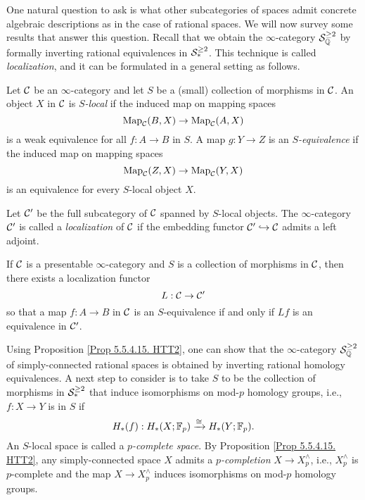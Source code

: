 One natural question to ask is what other subcategories of spaces admit concrete algebraic descriptions as in the case of rational spaces.
We will now survey some results that answer this question.
Recall that we obtain the $\infty$-category ${\mathcal{S}}^{\geq 2}_{{\mathbb{Q}}}$ by formally inverting rational equivalences in ${\mathcal{S}}^{\geq 2}_{*}$. This technique is called \emph{localization}, and it can be formulated in a general setting as follows.
\begin{definition}
\label{localization}
Let ${\mathcal{C}}$ be an $\infty$-category and let $S$ be a (small) collection of morphisms in ${\mathcal{C}}$. 
An object $X$ in ${\mathcal{C}}$ is \emph{$S$-local} if the induced map on mapping spaces
$$
\operatorname{Map}_{{\mathcal{C}}}(B, X) \to \operatorname{Map}_{{\mathcal{C}}}(A, X)
$$
is a weak equivalence for all $f:A \to B$ in $S$. A map $g:Y \to Z$ is an \emph{$S$-equivalence} if the induced map on mapping spaces
$$
\operatorname{Map}_{{\mathcal{C}}}(Z, X) \to \operatorname{Map}_{{\mathcal{C}}}(Y, X)
$$
is an equivalence for every $S$-local object $X$.
\end{definition}
Let ${\mathcal{C}}'$ be the full subcategory of ${\mathcal{C}}$ spanned by $S$-local objects. The $\infty$-category ${\mathcal{C}}'$ is called a \emph{localization} of ${\mathcal{C}}$ if the embedding functor ${\mathcal{C}}' \hookrightarrow {\mathcal{C}}$ admits a left adjoint.
\begin{proposition}
\cite[Proposition 5.5.4.15.]{HTT}
\label{Prop 5.5.4.15. HTT2}
If ${\mathcal{C}}$ is a presentable $\infty$-category and $S$ is a collection of morphisms in ${\mathcal{C}}$, then there exists a localization functor
$$
L:{\mathcal{C}} \to {\mathcal{C}}'
$$
so that a map $f:A\to B$ in ${\mathcal{C}}$ is an $S$-equivalence if and only if $Lf$ is an equivalence in ${\mathcal{C}}'$.
\end{proposition}

Using Proposition \ref{Prop 5.5.4.15. HTT2}, one can show that the $\infty$-category ${\mathcal{S}}^{\geq 2}_{{\mathbb{Q}}}$ of simply-connected rational spaces is obtained by inverting rational homology equivalences. 
A next step to consider is to take 
$S$ to be the collection of morphisms in ${\mathcal{S}}^{\geq 2}_*$ that induce isomorphisms on mod-$p$ homology groups, i.e., $f: X \to Y$ is in $S$ if 
$$
H_*(f):H_{*}(X;{\mathbb{F}}_p) \xrightarrow{\cong} H_*(Y; {\mathbb{F}}_p).
$$
An $S$-local space is called a \emph{$p$-complete space}. By Proposition \ref{Prop 5.5.4.15. HTT2}, any simply-connected space $X$ admits a
\emph{$p$-completion} $X \to X^{\wedge}_p$, i.e., $X^{\wedge}_p$ is $p$-complete and the map $X \to X^{\wedge}_p$ induces isomorphisms on mod-$p$ homology groups.

